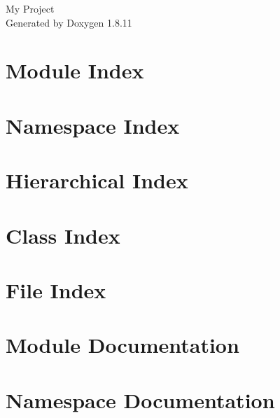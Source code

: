 \documentclass[twoside]{book}
\newcommand{\+}{\discretionary{\mbox{\scriptsize$\hookleftarrow$}}{}{}}
\newcommand{\clearemptydoublepage}{%
  \newpage{\pagestyle{empty}\cleardoublepage}%
}
\begin{document}
\hypersetup{pageanchor=false,
             bookmarksnumbered=true,
             pdfencoding=unicode
            }
\begin{titlepage}
\vspace*{7cm}
\begin{center}%
{\Large My Project }\\
\vspace*{1cm}
{\large Generated by Doxygen 1.8.11}\\
\end{center}
\end{titlepage}
\clearemptydoublepage
\tableofcontents
\clearemptydoublepage
{}
\hypersetup{pageanchor=true}

\chapter{Module Index}

\chapter{Namespace Index}

\chapter{Hierarchical Index}

\chapter{Class Index}

\chapter{File Index}

\chapter{Module Documentation}









\chapter{Namespace Documentation}







\end{document}
